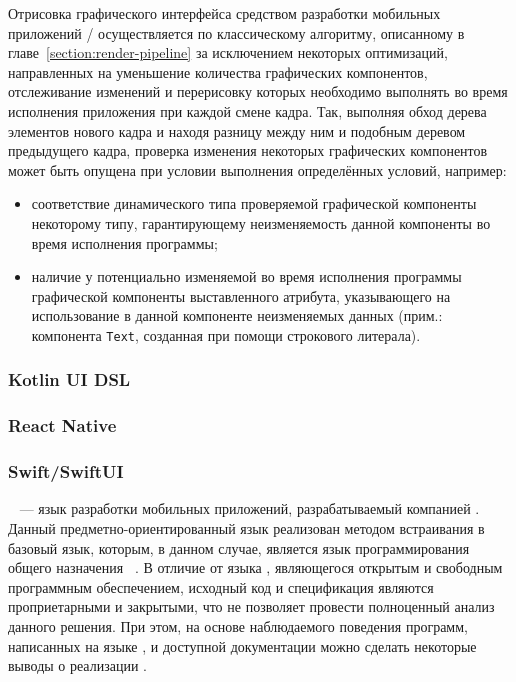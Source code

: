 Отрисовка графического интерфейса средством разработки мобильных
приложений / осуществляется по классическому
алгоритму, описанному в главе~\ref{section:render-pipeline} за исключением
некоторых оптимизаций, направленных на уменьшение количества графических
компонентов, отслеживание изменений и перерисовку которых необходимо
выполнять во время исполнения приложения при каждой смене кадра. Так,
выполняя обход дерева элементов нового кадра и находя разницу между ним
и подобным деревом предыдущего кадра, проверка изменения некоторых
графических компонентов может быть опущена при условии выполнения
определённых условий, например:
\begin{itemize}
	\item соответствие динамического типа проверяемой графической компоненты
	некоторому типу, гарантирующему неизменяемость данной компоненты
	во время исполнения программы;
	\item наличие у потенциально изменяемой во время исполнения программы
	графической компоненты выставленного атрибута, указывающего
	на использование в данной компоненте неизменяемых данных (прим.:
	компонента \texttt{Text}, созданная при помощи строкового литерала).
\end{itemize}

\subsubsection*{Kotlin UI DSL}

\subsubsection*{React Native}

\subsubsection*{Swift/SwiftUI}
~\cite{swiftui-homepage} --- язык разработки мобильных
приложений, разрабатываемый компанией . Данный
предметно-ориентированный язык реализован методом встраивания в базовый
язык, которым, в данном случае, является язык программирования общего
назначения ~\cite{swift-homepage}. В отличие от языка
, являющегося открытым и свободным программным обеспечением,
исходный код и спецификация  являются проприетарными и
закрытыми, что не позволяет провести полноценный анализ данного решения.
При этом, на основе наблюдаемого поведения программ, написанных на языке
, и доступной документации можно сделать некоторые выводы о
реализации .

